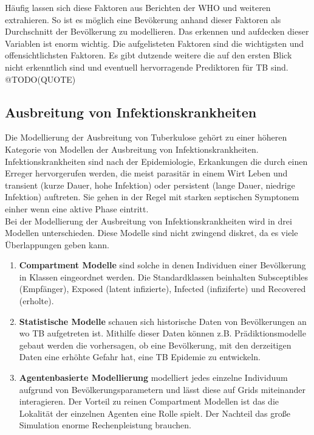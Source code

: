 \documentclass[paper=a4, fontsize=11pt, ngerman, abstract=on]{scrartcl}
\numberwithin{equation}{section} %
\numberwithin{figure}{section} %
\numberwithin{table}{section} %
\begin{document}
Häufig lassen sich diese Faktoren aus Berichten der WHO und weiteren extrahieren. So ist es möglich eine Bevökerung anhand dieser Faktoren als Durchschnitt der Bevölkerung zu modellieren. Das erkennen und aufdecken dieser Variablen ist enorm wichtig. Die aufgelisteten Faktoren sind die wichtigsten und offensichtlichsten Faktoren. Es gibt dutzende weitere die auf den ersten Blick nicht erkenntlich sind und eventuell hervorragende Prediktoren für TB sind. @TODO(QUOTE)

\subsection{Ausbreitung von Infektionskrankheiten}

Die Modellierung der Ausbreitung von Tuberkulose gehört zu einer höheren Kategorie von Modellen der Ausbreitung von Infektionskrankheiten. Infektionskrankheiten sind nach der Epidemiologie, Erkankungen die durch einen Erreger hervorgerufen werden, die meist parasitär in einem Wirt Leben und transient (kurze Dauer, hohe Infektion) oder persistent (lange Dauer, niedrige Infektion) auftreten. Sie gehen in der Regel mit starken septischen Symptonem einher wenn eine aktive Phase eintritt. \\

Bei der Modellierung der Ausbreitung von Infektionskrankheiten wird in drei Modellen unterschieden. Diese Modelle sind nicht zwingend diskret, da es viele Überlappungen geben kann.

\begin{enumerate}
  \item{\textbf{Compartment Modelle} sind solche in denen Individuen einer Bevölkerung in Klassen eingeordnet werden. Die Standardklassen beinhalten Subsceptibles (Empfänger), Exposed (latent infizierte), Infected (infiziferte) und Recovered (erholte).}
  \item{\textbf{Statistische Modelle} schauen sich historische Daten von Bevölkerungen an wo TB aufgetreten ist. Mithilfe dieser Daten können z.B. Prädiktionsmodelle gebaut werden die vorhersagen, ob eine Bevölkerung, mit den derzeitigen Daten eine erhöhte Gefahr hat, eine TB Epidemie zu entwickeln.}
  \item{\textbf{Agentenbasierte Modellierung} modelliert jedes einzelne Individuum aufgrund von Bevölkerungsparametern und lässt diese auf Grids miteinander interagieren. Der Vorteil zu reinen Compartment Modellen ist das die Lokalität der einzelnen Agenten eine Rolle spielt. Der Nachteil das große Simulation enorme Rechenpleistung brauchen.}
\end{enumerate}
\end{document}
